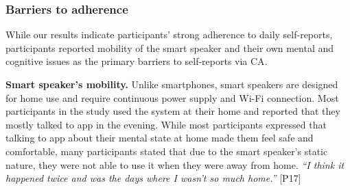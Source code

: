     
    \subsubsection{Barriers to adherence}
        While our results indicate participants' strong adherence to daily self-reports, participants reported mobility of the smart speaker and their own mental and cognitive issues as the primary barriers to self-reports via \ac{CA}.
        
        
        \textbf{Smart speaker's mobility. }
        Unlike smartphones, smart speakers are designed for home use and require continuous power supply and Wi-Fi connection.
        Most participants in the study used the system at their home and reported that they mostly talked to \acl{app} in the evening. 
        While most participants expressed that talking to \acl{app} about their mental state at home made them feel safe and comfortable, 
        many participants stated that due to the smart speaker's static nature, they were not able to use it when they were away from home.
            \textit{``I think it happened twice and was the days where I wasn’t so much home.''}
            [P17]
        
        
